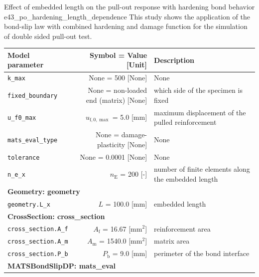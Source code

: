 \documentclass[main.tex]{subfiles}
\begin{document}
\begin{bmcsex}{Effect of embedded length on the pull-out response with hardening bond behavior
    }{e43_po_hardening_length_dependence}
\noindent This study shows the application of the bond-slip law
    with combined hardening and damage function for the simulation of
    double sided pull-out test. 
     \\
\begin{center}
            
{\scriptsize 
\begin{longtable}{lrp{4cm}}\toprule
\textbf{\textsf{Model parameter}} 
& 
\textbf{\textsf{Symbol = Value [Unit]}} 
&
\textbf{\textsf{Description}}  \\\midrule \midrule
\texttt{k\_max} & None = 500 [None] & {\footnotesize None}  \\
            \texttt{fixed\_boundary} & None = non-loaded end (matrix) [None] & {\footnotesize which side of the specimen is fixed}  \\
            \texttt{u\_f0\_max} & $u_{\mathrm{f},0,{\max}}$ = 5.0 [mm] & {\footnotesize maximum displacement of the pulled reinforcement}  \\
            \texttt{mats\_eval\_type} & None = damage-plasticity [None] & {\footnotesize None}  \\
            \texttt{tolerance} & None = 0.0001 [None] & {\footnotesize None}  \\
            \texttt{n\_e\_x} & $n_\mathrm{E}$ = 200 [-] & {\footnotesize number of finite elements along the embedded length}  \\
            \midrule
\multicolumn{3}{l}{\textbf{\textsf{Geometry: geometry}}}\\

\texttt{geometry.L\_x} & $L$ = 100.0 [$\mathrm{mm}$] & {\footnotesize embedded length}  \\
            \midrule
\multicolumn{3}{l}{\textbf{\textsf{CrossSection: cross\_section}}}\\

\texttt{cross\_section.A\_f} & $A_\mathrm{f}$ = 16.67 [$\mathrm{mm}^2$] & {\footnotesize reinforcement area}  \\
            \texttt{cross\_section.A\_m} & $A_\mathrm{m}$ = 1540.0 [$\mathrm{mm}^2$] & {\footnotesize matrix area}  \\
            \texttt{cross\_section.P\_b} & $P_\mathrm{b}$ = 9.0 [$\mathrm{mm}$] & {\footnotesize perimeter of the bond interface}  \\
            \midrule
\multicolumn{3}{l}{\textbf{\textsf{MATSBondSlipDP: mats\_eval}}}\\


\end{longtable}}
\end{center}
\end{bmcsex}
\end{document}
